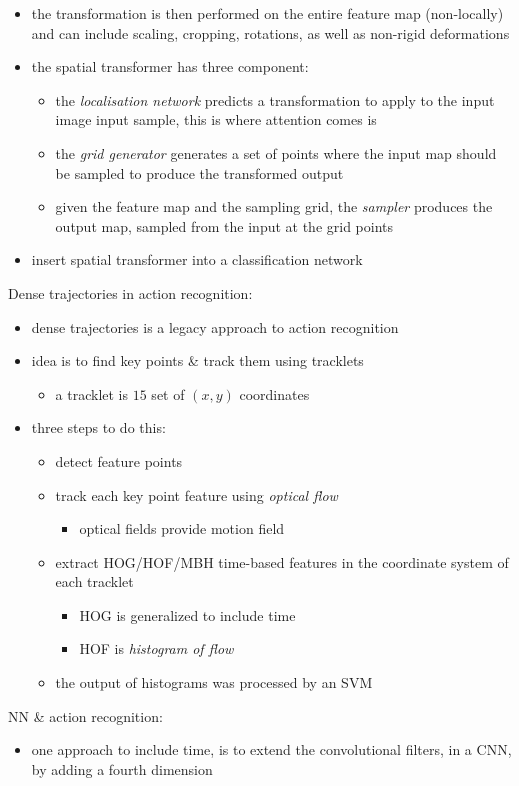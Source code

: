 \documentclass[onecolumn]{IEEEtran}
\newcommand{\bi}{\begin{itemize}}
\newcommand{\ei}{\end{itemize}}
\begin{document}
\begin{itemize}
        \item  the transformation is then performed on the entire feature map (non-locally) and can include scaling, cropping, rotations, as well as non-rigid deformations
        \item the spatial transformer has three component:
        \bi
            \item the \emph{localisation network} predicts a transformation to apply to the input image input sample, this is where attention comes is
            \item the \emph{grid generator} generates a set of points where the input map should be sampled to produce the transformed output
            \item given the feature map and the sampling grid, the \emph{sampler} produces the output map, sampled from the input at the grid points
        \ei
        \item insert spatial transformer into a classification network
    \ei
    \item Dense trajectories in action recognition:
    \bi
        \item dense trajectories is a legacy approach to action recognition
        \item idea is to find key points \& track them using tracklets
        \bi
            \item a tracklet is $15$ set of $(x,y)$ coordinates
        \ei
        \item three steps to do this:
        \bi
            \item detect feature points
            \item track each key point feature using \emph{optical flow}
            \bi
                \item optical fields provide motion field
            \ei
            \item extract HOG/HOF/MBH time-based features in the coordinate system of each tracklet
            \bi
                \item HOG is generalized to include time
                \item HOF is \emph{histogram of flow}
            \ei
            \item the output of histograms was processed by an SVM
        \ei
    \ei
    \item NN \& action recognition:
    \bi
        \item one approach to include time, is to extend the convolutional filters, in a CNN, by adding a fourth dimension

\end{itemize}
\end{document}
